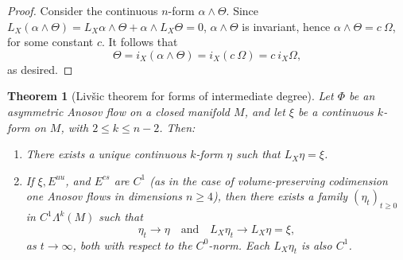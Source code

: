 \documentclass[11pt,letterpaper,reqno,abstract=true]{scrartcl}
\theoremstyle{plain}                              %
\newtheorem{thm}{Theorem}[section]
\theoremstyle{definition}                         %
\theoremstyle{remark}                             %
\begin{document}
\begin{proof}
    Consider the continuous $n$-form $\alpha \wedge \Theta$. Since
    $L_X(\alpha \wedge \Theta) = L_X \alpha \wedge \Theta + \alpha
    \wedge L_X \Theta = 0$, $\alpha \wedge \Theta$ is invariant, hence
    $\alpha \wedge \Theta = c \: \Omega$, for some constant $c$. It
    follows that
    \begin{displaymath}
      \Theta = i_X (\alpha \wedge \Theta) = i_X (c \: \Omega) = c \:
      i_X \Omega,
    \end{displaymath}
    as desired.
\end{proof}

\begin{thm}[Liv\v{s}ic theorem for forms of intermediate degree]    \label{thm:Lie}
%
  Let $\Phi$ be an asymmetric Anosov flow on a closed manifold $M$,
  and let $\xi$ be a continuous $k$-form on $M$, with
  $2 \leq k \leq n-2$. Then:

  \begin{enumerate}

  \item[(a)] There exists a unique continuous $k$-form $\eta$ such
    that $L_X \eta = \xi$.

  \item[(b)] If $\xi, E^{uu}$, and $E^{cs}$ are $C^1$ (as in the case
    of volume-preserving codimension one Anosov flows in dimensions
    $n \geq 4$), then there exists a family $(\eta_t)_{t \geq 0}$ in
    $C^1 \Lambda^k(M)$ such that
%
  \begin{displaymath}
    \eta_t \to \eta \quad \text{and} \quad L_X \eta_t \to L_X \eta = \xi,
  \end{displaymath}
%
  as $t \to \infty$, both with respect to the $C^0$-norm. Each
  $L_X \eta_t$ is also $C^1$.

  \end{enumerate}
%
\end{thm}
\end{document}
